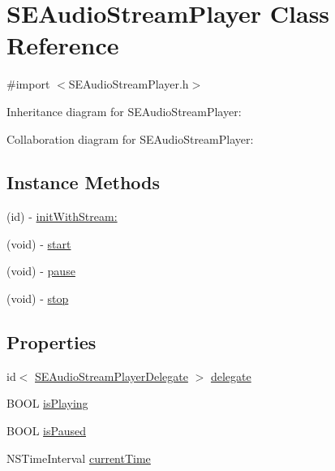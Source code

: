 \hypertarget{interface_s_e_audio_stream_player}{\section{S\-E\-Audio\-Stream\-Player Class Reference}
\label{interface_s_e_audio_stream_player}
}


{\ttfamily \#import $<$S\-E\-Audio\-Stream\-Player.\-h$>$}



Inheritance diagram for S\-E\-Audio\-Stream\-Player\-:


Collaboration diagram for S\-E\-Audio\-Stream\-Player\-:
\subsection*{Instance Methods}
\begin{DoxyCompactItemize}
\item 
(id) -\/ \hyperlink{interface_s_e_audio_stream_player_af81895d0a82b3255e9b9840def52599b}{init\-With\-Stream\-:}
\item 
(void) -\/ \hyperlink{interface_s_e_audio_stream_player_a16c600129d3045dc7f7213165df3ca66}{start}
\item 
(void) -\/ \hyperlink{interface_s_e_audio_stream_player_ab9e4c08bf6710368576d15ea05ecfe32}{pause}
\item 
(void) -\/ \hyperlink{interface_s_e_audio_stream_player_a80491754758a4dab432e18fcafb0721d}{stop}
\end{DoxyCompactItemize}
\subsection*{Properties}
\begin{DoxyCompactItemize}
\item 
id$<$ \hyperlink{protocol_s_e_audio_stream_player_delegate-p}{S\-E\-Audio\-Stream\-Player\-Delegate} $>$ \hyperlink{interface_s_e_audio_stream_player_a423b5909f11bd592bbef74ac92b18a30}{delegate}
\item 
B\-O\-O\-L \hyperlink{interface_s_e_audio_stream_player_ae9c780174af7f5d4bbd970049f7d1bb5}{is\-Playing}
\item 
B\-O\-O\-L \hyperlink{interface_s_e_audio_stream_player_ad6bec3654ff73d3fd4d11111a1f69442}{is\-Paused}
\item 
N\-S\-Time\-Interval \hyperlink{interface_s_e_audio_stream_player_a079874e98c33b3fc543f9ca6ea2a59e7}{current\-Time}
\end{DoxyCompactItemize}


